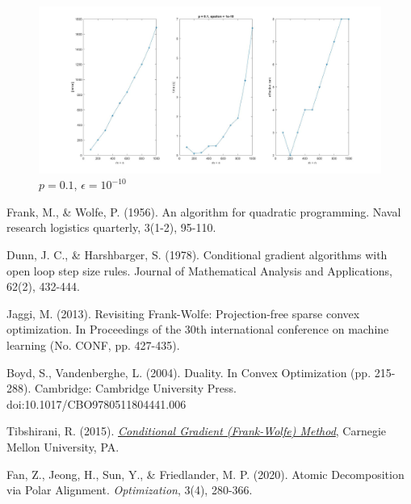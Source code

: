 \documentclass[12pt]{article}
\begin{document}
\begin{figure}[H]
    \centering
    \includegraphics[width=\textwidth]{data/p2.jpg}
    \caption{$p = 0.1$, $\epsilon = 10^{-10}$}
    \label{img4}
\end{figure}


\begin{thebibliography}{}
 Frank, M., \& Wolfe, P. (1956). An algorithm for quadratic programming. Naval research logistics quarterly, 3(1-2), 95-110.

 Dunn, J. C., \& Harshbarger, S. (1978). Conditional gradient algorithms with open loop step size rules. Journal of Mathematical Analysis and Applications, 62(2), 432-444.

 Jaggi, M. (2013). Revisiting Frank-Wolfe: Projection-free sparse convex optimization. In Proceedings of the 30th international conference on machine learning (No. CONF, pp. 427-435).

 Boyd, S., Vandenberghe, L. (2004). Duality. In Convex Optimization (pp. 215-288). Cambridge: Cambridge University Press. doi:10.1017/CBO9780511804441.006


 Tibshirani, R. (2015). \href{http://www.stat.cmu.edu/~ryantibs/convexopt-S15/lectures/23-cond-grad.pdf}{\textit{Conditional Gradient (Frank-Wolfe) Method}}, Carnegie Mellon University, PA.

 Fan, Z., Jeong, H., Sun, Y., \& Friedlander, M. P. (2020). Atomic Decomposition via Polar Alignment. \textit{Optimization}, 3(4), 280-366.

\end{thebibliography}

 
\end{document}
